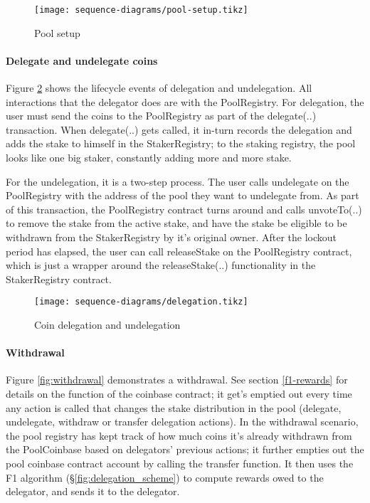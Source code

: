 \begin{figure}[ht]
\centering
\texttt{[image: sequence-diagrams/pool-setup.tikz]}
\caption{Pool setup}
\label{fig:pool_setup}
\end{figure}

\paragraph{Delegate and undelegate coins}

Figure \ref{fig:delegation} shows the lifecycle events of delegation and undelegation. All interactions that the delegator does are with the PoolRegistry. For delegation, the user must send the coins to the PoolRegistry as part of the delegate(..) transaction. When delegate(..) gets called, it in-turn records the delegation and adds the stake to himself in the StakerRegistry; to the staking registry, the pool looks like one big staker, constantly adding more and more stake. 

For the undelegation, it is a two-step process. The user calls undelegate on the PoolRegistry with the address of the pool they want to undelegate from. As part of this transaction, the PoolRegistry contract turns around and calls unvoteTo(..) to remove the stake from the active stake, and have the stake be eligible to be withdrawn from the StakerRegistry by it's original owner. After the lockout period has elapsed, the user can call releaseStake on the PoolRegistry contract, which is just a wrapper around the releaseStake(..) functionality in the StakerRegistry contract. 

\begin{figure}[ht]
\centering
\texttt{[image: sequence-diagrams/delegation.tikz]}
\caption{Coin delegation and undelegation}
\label{fig:delegation}
\end{figure}

\paragraph{Withdrawal}

Figure \ref{fig:withdrawal} demonstrates a withdrawal. See section \ref{f1-rewards} for details on the function of the coinbase contract; it get's emptied out every time any action is called that changes the stake distribution in the pool (delegate, undelegate, withdraw or transfer delegation actions). In the withdrawal scenario, the pool registry has kept track of how much coins it's already withdrawn from the PoolCoinbase based on delegators' previous actions; it further empties out the pool coinbase contract account by calling the transfer function. It then uses the F1 algorithm (\S\ref{fig:delegation_scheme}) to compute rewards owed to the delegator, and sends it to the delegator.  

